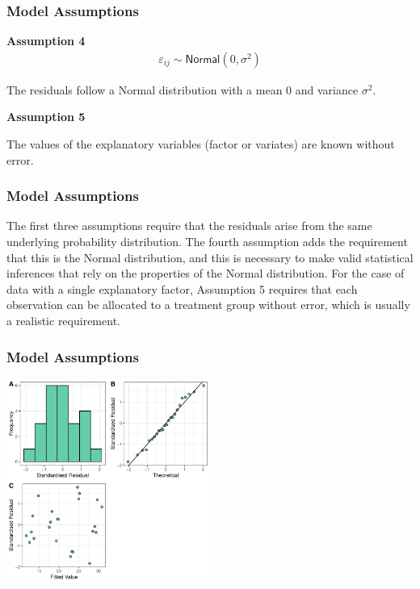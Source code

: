 \begin{frame}\frametitle{Model Assumptions}

\textbf{Assumption 4}
\begin{eqnarray*}
\varepsilon_{ij} \sim \textsf{Normal}(0, \sigma^2)
\end{eqnarray*}

The residuals follow a Normal distribution with a mean 0 and variance $\sigma^2$.

\vspace{1cm}


\textbf{Assumption 5}

The values of the explanatory variables (factor or variates) are known without error.
\end{frame}


\begin{frame}\frametitle{Model Assumptions}
The first three assumptions require that the residuals arise from the same underlying probability distribution. The
fourth assumption adds the requirement that this is the Normal distribution, and this is necessary to make valid
statistical inferences that rely on the properties of the Normal distribution.  For the case of data with a single
explanatory factor, Assumption 5 requires that each observation can be allocated to a treatment group without error,
which is usually a realistic requirement.

\end{frame}


\begin{frame}\frametitle{Model Assumptions}
\includegraphics[width=0.5\textwidth]{GoodResplot.pdf}
\end{frame}

